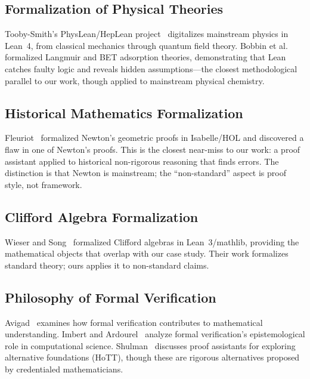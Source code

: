 \documentclass[runningheads]{llncs}
\begin{document}
\subsection{Formalization of Physical Theories}

Tooby-Smith's PhysLean/HepLean project~\cite{toobysmith2025physlean}
digitalizes mainstream physics in Lean~4, from classical mechanics through
quantum field theory. Bobbin et al.~\cite{bobbin2024chemical} formalized
Langmuir and BET adsorption theories, demonstrating that Lean catches faulty
logic and reveals hidden assumptions---the closest methodological parallel to
our work, though applied to mainstream physical chemistry.

\subsection{Historical Mathematics Formalization}

Fleuriot~\cite{fleuriot2001newton} formalized Newton's geometric
proofs in Isabelle/HOL and discovered a flaw in one of Newton's proofs. This
is the closest near-miss to our work: a proof assistant applied to historical
non-rigorous reasoning that finds errors. The distinction is that Newton is
mainstream; the ``non-standard'' aspect is proof style, not framework.

\subsection{Clifford Algebra Formalization}

Wieser and Song~\cite{wieser2021clifford} formalized Clifford algebras in
Lean~3/mathlib, providing the mathematical objects that overlap with our case
study. Their work formalizes standard theory; ours applies it to non-standard
claims.

\subsection{Philosophy of Formal Verification}

Avigad~\cite{avigad2021understanding} examines how formal verification
contributes to mathematical understanding. Imbert and
Ardourel~\cite{imbert2023formal} analyze formal verification's epistemological
role in computational science. Shulman~\cite{shulman2024strange} discusses proof
assistants for exploring alternative foundations (HoTT), though these are
rigorous alternatives proposed by credentialed mathematicians.
\end{document}
